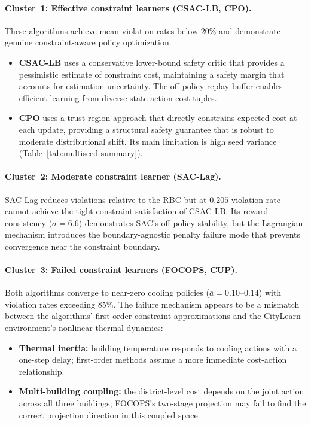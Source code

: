 \paragraph{Cluster~1: Effective constraint learners (CSAC-LB, CPO).}
These algorithms achieve mean violation rates below 20\% and demonstrate
genuine constraint-aware policy optimization.
\begin{itemize}
  \item \textbf{CSAC-LB} uses a conservative lower-bound safety critic that
    provides a pessimistic estimate of constraint cost, maintaining a safety
    margin that accounts for estimation uncertainty.  The off-policy replay
    buffer enables efficient learning from diverse state-action-cost tuples.
  \item \textbf{CPO} uses a trust-region approach that directly constrains
    expected cost at each update, providing a structural safety guarantee
    that is robust to moderate distributional shift.  Its main limitation is
    high seed variance (Table~\ref{tab:multiseed-summary}).
\end{itemize}

\paragraph{Cluster~2: Moderate constraint learner (SAC-Lag).}
SAC-Lag reduces violations relative to the RBC but at $0.205$ violation rate
cannot achieve the tight constraint satisfaction of CSAC-LB.  Its reward
consistency ($\sigma = 6.6$) demonstrates SAC's off-policy stability, but the
Lagrangian mechanism introduces the boundary-agnostic penalty failure mode
that prevents convergence near the constraint boundary.

\paragraph{Cluster~3: Failed constraint learners (FOCOPS, CUP).}
Both algorithms converge to near-zero cooling policies ($\bar{a} = 0.10$--$0.14$)
with violation rates exceeding 85\%.  The failure mechanism appears to be a
mismatch between the algorithms' first-order constraint approximations and the
CityLearn environment's nonlinear thermal dynamics:
\begin{itemize}
  \item \textbf{Thermal inertia:} building temperature responds to cooling
    actions with a one-step delay; first-order methods assume a more immediate
    cost-action relationship.
  \item \textbf{Multi-building coupling:} the district-level cost depends on
    the joint action across all three buildings; FOCOPS's two-stage projection
    may fail to find the correct projection direction in this coupled space.
\end{itemize}


